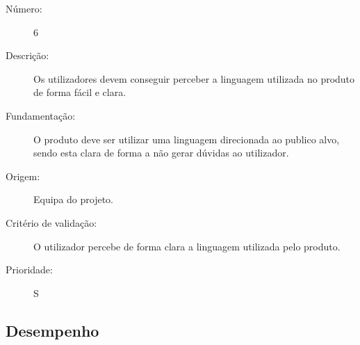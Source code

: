 \documentclass[12pt,a4paper]{article}
\begin{document}
      \vspace{0.5cm}
      \begin{description}
        \item[Número:]6
        \item[Descrição:]Os utilizadores devem conseguir perceber a linguagem utilizada no produto de forma fácil e clara.
        \item[Fundamentação:]O produto deve ser utilizar uma linguagem direcionada ao publico alvo, sendo esta clara de forma a não gerar dúvidas ao utilizador.
        \item[Origem:]Equipa do projeto.
        \item[Critério de validação:]O utilizador percebe de forma clara a linguagem utilizada pelo produto.
        \item[Prioridade:]S
      \end{description}

  \subsection{Desempenho}
\end{document}
